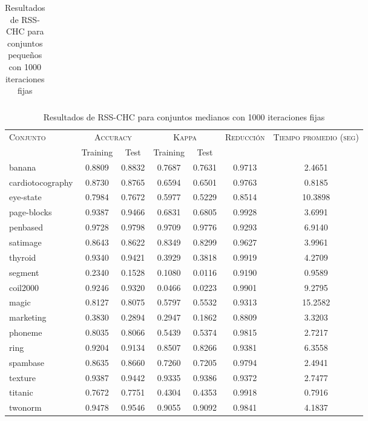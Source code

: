 \begin{table}[]
\begin{tabular}{l c c c c c c}
\hline
\end{tabular}
\caption{Resultados de RSS-CHC para conjuntos pequeños con 1000 iteraciones fijas}
\label{res-peq-RSS-CHC}
\end{table}


\begin{table}[]
\centering
\begin{tabular}{l c c c c c c}
\hline
\multirow{2}{*}{\textsc{Conjunto}}
	& \multicolumn{2}{c}{\textsc{Accuracy}}
	& \multicolumn{2}{c}{\textsc{Kappa}}
	& \textsc{Reducción}
	& \textsc{Tiempo promedio (seg)} \\
	& Training & Test
	& Training & Test \\ 
\hline
\hline

banana & 0.8809 & 0.8832 & 0.7687 & 0.7631 & 0.9713 & 2.4651 \\
cardiotocography & 0.8730 & 0.8765 & 0.6594 & 0.6501 & 0.9763 & 0.8185 \\
eye-state & 0.7984 & 0.7672 & 0.5977 & 0.5229 & 0.8514 & 10.3898 \\
page-blocks & 0.9387 & 0.9466 & 0.6831 & 0.6805 & 0.9928 & 3.6991 \\
penbased & 0.9728 & 0.9798 & 0.9709 & 0.9776 & 0.9293 & 6.9140 \\
satimage & 0.8643 & 0.8622 & 0.8349 & 0.8299 & 0.9627 & 3.9961 \\
thyroid & 0.9340 & 0.9421 & 0.3929 & 0.3818 & 0.9919 & 4.2709 \\
segment & 0.2340 & 0.1528 & 0.1080 & 0.0116 & 0.9190 & 0.9589 \\
coil2000 & 0.9246 & 0.9320 & 0.0466 & 0.0223 & 0.9901 & 9.2795 \\
magic & 0.8127 & 0.8075 & 0.5797 & 0.5532 & 0.9313 & 15.2582 \\
marketing & 0.3830 & 0.2894 & 0.2947 & 0.1862 & 0.8809 & 3.3203 \\
phoneme & 0.8035 & 0.8066 & 0.5439 & 0.5374 & 0.9815 & 2.7217 \\
ring & 0.9204 & 0.9134 & 0.8507 & 0.8266 & 0.9381 & 6.3558 \\
spambase & 0.8635 & 0.8660 & 0.7260 & 0.7205 & 0.9794 & 2.4941 \\
texture & 0.9387 & 0.9442 & 0.9335 & 0.9386 & 0.9372 & 2.7477 \\
titanic & 0.7672 & 0.7751 & 0.4304 & 0.4353 & 0.9918 & 0.7916 \\
twonorm & 0.9478 & 0.9546 & 0.9055 & 0.9092 & 0.9841 & 4.1837 \\

\hline
\end{tabular}
\caption{Resultados de RSS-CHC para conjuntos medianos con 1000 iteraciones fijas}
\label{res-med-RSS-CHC}
\end{table}



